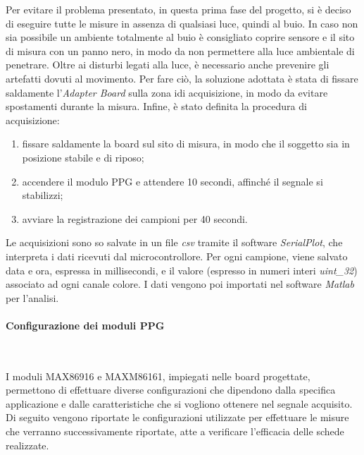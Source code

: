 Per evitare il problema presentato, in questa prima fase del progetto, si è deciso di eseguire tutte le misure in assenza di qualsiasi luce, quindi al buio. In caso non sia possibile un ambiente totalmente al buio è consigliato coprire sensore e il sito di misura con un panno nero, in modo da non permettere alla luce ambientale di penetrare.
Oltre ai disturbi legati alla luce, è necessario anche prevenire gli artefatti dovuti al movimento. Per fare ciò, la soluzione adottata è stata di fissare saldamente l'\textit{Adapter Board} sulla zona idi acquisizione, in modo da evitare spostamenti durante la misura.
Infine, è stato definita la procedura di acquisizione:
\begin{enumerate}
	\item fissare saldamente la board sul sito di misura, in modo che il soggetto sia in posizione stabile e di riposo;
	\item accendere il modulo PPG e attendere 10 secondi, affinché il segnale si stabilizzi;
	\item avviare la registrazione dei campioni per 40 secondi.
\end{enumerate}
Le acquisizioni sono so salvate in un file \textit{csv} tramite il software \textit{SerialPlot}, che interpreta i dati ricevuti dal microcontrollore. Per ogni campione, viene salvato data e ora, espressa in millisecondi, e il valore (espresso in numeri interi \textit{uint\_32}) associato ad ogni canale colore. I dati vengono poi importati nel software \textit{Matlab} per l'analisi.


\paragraph{Configurazione dei moduli PPG}~


\noindent I moduli MAX86916 e MAXM86161, impiegati nelle board progettate, permettono di effettuare diverse configurazioni che dipendono dalla specifica applicazione e dalle caratteristiche che si vogliono ottenere nel segnale acquisito. Di seguito vengono riportate le configurazioni utilizzate per effettuare le misure che verranno successivamente riportate, atte a verificare l'efficacia delle schede realizzate.

